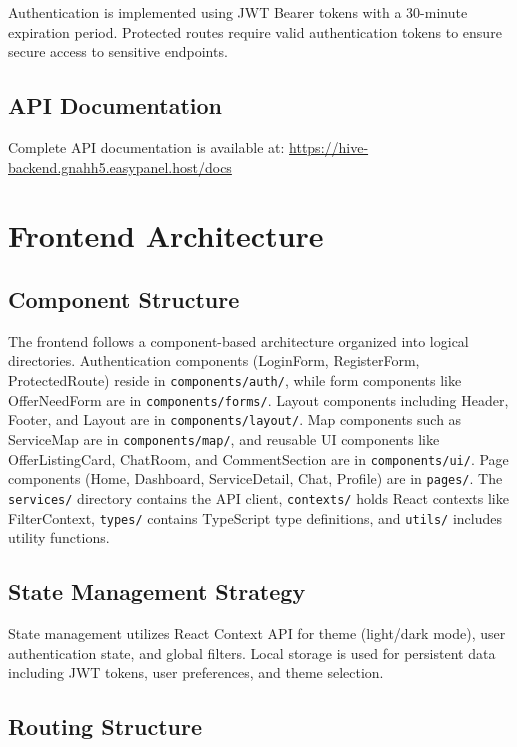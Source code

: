 \documentclass[12pt,a4paper]{report}
\begin{document}
Authentication is implemented using JWT Bearer tokens with a 30-minute expiration period. Protected routes require valid authentication tokens to ensure secure access to sensitive endpoints.

\subsection{API Documentation}

Complete API documentation is available at: \url{https://hive-backend.gnahh5.easypanel.host/docs}

\section{Frontend Architecture}

\subsection{Component Structure}

The frontend follows a component-based architecture organized into logical directories. Authentication components (LoginForm, RegisterForm, ProtectedRoute) reside in \texttt{components/auth/}, while form components like OfferNeedForm are in \texttt{components/forms/}. Layout components including Header, Footer, and Layout are in \texttt{components/layout/}. Map components such as ServiceMap are in \texttt{components/map/}, and reusable UI components like OfferListingCard, ChatRoom, and CommentSection are in \texttt{components/ui/}. Page components (Home, Dashboard, ServiceDetail, Chat, Profile) are in \texttt{pages/}. The \texttt{services/} directory contains the API client, \texttt{contexts/} holds React contexts like FilterContext, \texttt{types/} contains TypeScript type definitions, and \texttt{utils/} includes utility functions.

\subsection{State Management Strategy}

State management utilizes React Context API for theme (light/dark mode), user authentication state, and global filters. Local storage is used for persistent data including JWT tokens, user preferences, and theme selection.

\subsection{Routing Structure}
\end{document}
